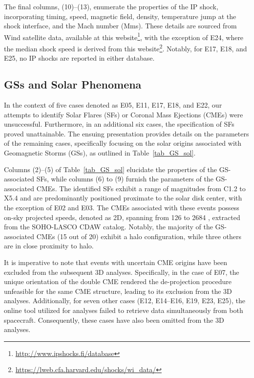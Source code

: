 The final columns, (10)–(13), enumerate the properties of the IP shock, incorporating timing, speed, magnetic field, density, temperature jump at the shock interface, and the Mach number (Mms). These details are sourced from Wind satellite data, available at this website\footnote{\url{http://www.ipshocks.fi/database}}, with the exception of E24, where the median shock speed is derived from this website\footnote{\url{https://lweb.cfa.harvard.edu/shocks/wi_data/}}. Notably, for E17, E18, and E25, no IP shocks are reported in either database.

\subsection{GSs and Solar Phenomena} %
In the context of five cases denoted as E05, E11, E17, E18, and E22, our attempts to identify Solar Flares (SFs) or Coronal Mass Ejections (CMEs) were unsuccessful. Furthermore, in an additional six cases, the specification of SFs proved unattainable. The ensuing presentation provides details on the parameters of the remaining cases, specifically focusing on the solar origins associated with Geomagnetic Storms (GSs), as outlined in Table~\ref{tab_GS_sol}.

Columns (2)–(5) of Table~\ref{tab_GS_sol} elucidate the properties of the GS-associated SFs, while columns (6) to (9) furnish the parameters of the GS-associated CMEs. The identified SFs exhibit a range of magnitudes from C1.2 to X5.4 and are predominantly positioned proximate to the solar disk center, with the exception of E02 and E03. The CMEs associated with these events possess on-sky projected speeds, denoted as 2D, spanning from 126 to 2684 \kms, extracted from the SOHO-LASCO CDAW catalog. Notably, the majority of the GS-associated CMEs (15 out of 20) exhibit a halo configuration, while three others are in close proximity to halo.

It is imperative to note that events with uncertain CME origins have been excluded from the subsequent 3D analyses. Specifically, in the case of E07, the unique orientation of the double CME rendered the de-projection procedure unfeasible for the same CME structure, leading to its exclusion from the 3D analyses. Additionally, for seven other cases (E12, E14–E16, E19, E23, E25), the online tool utilized for analyses failed to retrieve data simultaneously from both spacecraft. Consequently, these cases have also been omitted from the 3D analyses.


